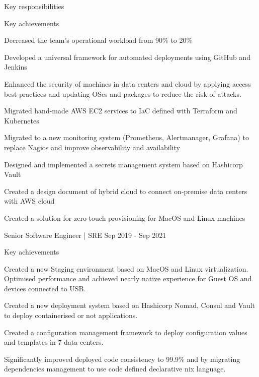 \begin{cventries}
{\begin{cvitems}{Key responsibilities}
        \end{cvitems}
        \begin{cvitems}{Key achievements}
            \item {Decreased the team's operational workload from 90\% to 20\%}
            \item {Developed a universal framework for automated deployments using GitHub and Jenkins}
            \item {Enhanced the security of machines in data centers and cloud by applying access best practices and updating OSes and packages to reduce the risk of attacks.}
            \item {Migrated hand-made AWS EC2 services to IaC defined with Terraform and Kubernetes}
            \item {Migrated to a new monitoring system (Prometheus, Alertmanager, Grafana) to replace Nagios and improve observability and availability}
            \item {Designed and implemented a secrets management system based on Hashicorp Vault}
            \item {Created a design document of hybrid cloud to connect on-premise data centers with AWS cloud}
            \item {Created a solution for zero-touch provisioning for MacOS and Linux machines}
        \end{cvitems}
    }

    \cventry
    {Senior Software Engineer | SRE} %
    {} %
    {} %
    {} %
    {Sep 2019 - Sep 2021} %
    {
      \begin{cvitems}{Key achievements} %
        \item {Created a new Staging environment based on MacOS and Linux virtualization. Optimised performance and achieved nearly native experience for Guest OS and devices connected to USB.}
        \item {Created a new deployment system based on Hashicorp Nomad, Consul and Vault to deploy containerised or not applications.}
        \item {Created a configuration management framework to deploy configuration values and templates in 7 data-centers.}
        \item {Significantly improved deployed code consistency to 99.9\% and by migrating dependencies management to use code defined declarative nix language.}
      \end{cvitems}
    }


\end{cventries}
